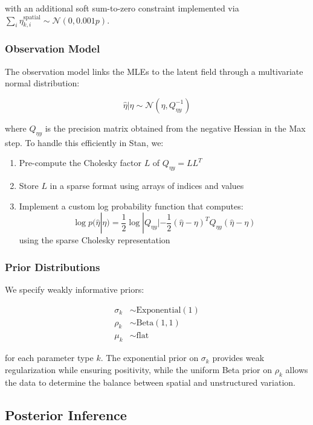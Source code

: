 \documentclass[
  letterpaper,
  DIV=11,
  numbers=noendperiod]{scrartcl}
\providecommand{\tightlist}{%
  \setlength{\itemsep}{0pt}\setlength{\parskip}{0pt}}\usepackage{longtable,booktabs,array}
\begin{document}
with an additional soft sum-to-zero constraint implemented via
\(\sum_i \eta^{\mathrm{spatial}}_{k,i} \sim \mathcal{N}(0, 0.001p)\).

\subsubsection{Observation Model}\label{observation-model}

The observation model links the MLEs to the latent field through a
multivariate normal distribution:

\[\hat{\eta} | \eta \sim \mathcal{N}(\eta, Q^{-1}_{\eta y})\]

where \(Q_{\eta y}\) is the precision matrix obtained from the negative
Hessian in the Max step. To handle this efficiently in Stan, we:

\begin{enumerate}
\def\labelenumi{\arabic{enumi}.}
\tightlist
\item
  Pre-compute the Cholesky factor \(L\) of \(Q_{\eta y} = LL^T\)
\item
  Store \(L\) in a sparse format using arrays of indices and values
\item
  Implement a custom log probability function that computes:
  \[\log p(\hat{\eta}|\eta) = \frac{1}{2}\log|Q_{\eta y}| - \frac{1}{2}(\hat{\eta} - \eta)^T Q_{\eta y}(\hat{\eta} - \eta)\]
  using the sparse Cholesky representation
\end{enumerate}

\subsubsection{Prior Distributions}\label{prior-distributions}

We specify weakly informative priors:

\[
\begin{aligned}
\sigma_k &\sim \mathrm{Exponential}(1) \\
\rho_k &\sim \mathrm{Beta}(1,1) \\
\mu_k &\sim \mathrm{flat}
\end{aligned}
\]

for each parameter type \(k\). The exponential prior on \(\sigma_k\)
provides weak regularization while ensuring positivity, while the
uniform Beta prior on \(\rho_k\) allows the data to determine the
balance between spatial and unstructured variation.

\subsection{Posterior Inference}\label{posterior-inference}
\end{document}
